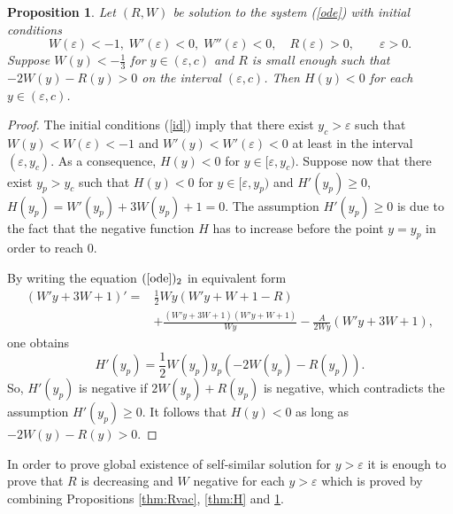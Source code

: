 \documentclass[reqno]{article}%
\theoremstyle{plain}
\newtheorem{proposition}{Proposition}[section]
\theoremstyle{definition}
\theoremstyle{remark}
\numberwithin{equation}{section}
\begin{document}
\begin{proposition}\label{thm:Hless}
 Let $(R,W)$ be solution to the system (\ref{ode}) with initial conditions
\begin{equation}\label{id}
W(\varepsilon)<-1,\; W'(\varepsilon)<0,\; W''(\varepsilon)<0, \quad R(\varepsilon)>0, \qquad \varepsilon>0.\end{equation}
 Suppose $W(y)< -\frac{1}{3}$ for $y\in(\varepsilon,c)$ and $R$ is small enough such that $-2W(y)-R(y)>0$ on the interval $(\varepsilon,c)$. Then $H(y)<0$ for each $y\in(\varepsilon,c)$.
\end{proposition}
\begin{proof}
The initial conditions (\ref{id}) imply that there exist $y_c>\varepsilon$ such that $W(y)<W(\varepsilon)<-1$ and $W'(y)<W'(\varepsilon)<0$ at least in the interval $(\varepsilon, y_c)$. As a consequence, $H(y)<0$ for $y\in[\varepsilon,y_c)$. Suppose now that there exist $y_p>y_c$ such that $H(y)<0$ for $y\in[\varepsilon,y_p)$ and $H'(y_p)\geq 0$, $H(y_p)=W'(y_p)+3W(y_p)+1=0$. The assumption $H'(y_p)\geq 0$ is due to the fact that the negative function $H$ has to increase before the point $y=y_p$ in order to reach 0.  

By writing the equation $(\ref{ode})_2$  in equivalent form
\begin{equation*}\label{eq2_equiv}
\begin{split}
(W'y+3W+1)'=&\frac{1}{2}Wy(W'y+W+1-R)\\&+\frac{(W'y+3W+1)(W'y+W+1)}{Wy}
-\frac{A}{2Wy}(W'y+3W+1),
\end{split}
\end{equation*}
one obtains
\begin{equation}\label{y_p}
	H'(y_p)=\frac{1}{2}W(y_p)y_p(-2W(y_p)-R(y_p)).
\end{equation}
So, $H'(y_p)$ is negative if $2W(y_p)+R(y_p)$ is negative, which contradicts the assumption $H'(y_p)\geq 0.$ It follows that $H(y)<0$ as long as $-2W(y)-R(y)>0.$
\end{proof}


In order to prove global existence of self-similar solution for $y>\varepsilon$ it is enough to prove that $R$ is decreasing and $W$ negative for each $y>\varepsilon$ which is proved by combining 	 Propositions \ref{thm:Rvac}, \ref{thm:H} and \ref{thm:Hless}. 
\end{document}
